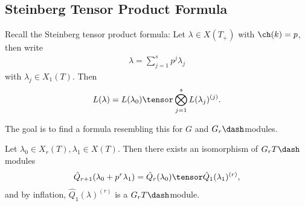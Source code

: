 \hypertarget{steinberg-tensor-product-formula}{%
\subsection{Steinberg Tensor Product
Formula}\label{steinberg-tensor-product-formula}}

Recall the Steinberg tensor product formula: Let \(\lambda \in X(T_+)\)
with \(\ch(k) = p\), then write
\begin{align*}  
\lambda = \sum_{j=1}^s p^j \lambda_j
\end{align*} with \(\lambda_j \in X_1(T)\). Then
\begin{align*}  
L(\lambda) = L(\lambda_0) \tensor \bigotimes_{j=1}^s L(\lambda_j)^{(j)}
.\end{align*}

The goal is to find a formula resembling this for \(G\) and
\(G_r\dash\)modules.

\begin{proposition}[?]

Let \(\lambda_0 \in X_r(T), \lambda_1 \in X(T)\). Then there exists an
isomorphism of \(G_r T\dash\)modules
\begin{align*}  
\hat{Q}_{r+1} (\lambda_0 + p^r \lambda_1) = \hat{Q}_r (\lambda_0) \tensor \hat{Q}_1(\lambda_1)^{(r)}
,\end{align*} and by inflation, \(\hat{Q}_1(\lambda)^{(r)}\) is a
\(G_r T\dash\)module.

\end{proposition}

